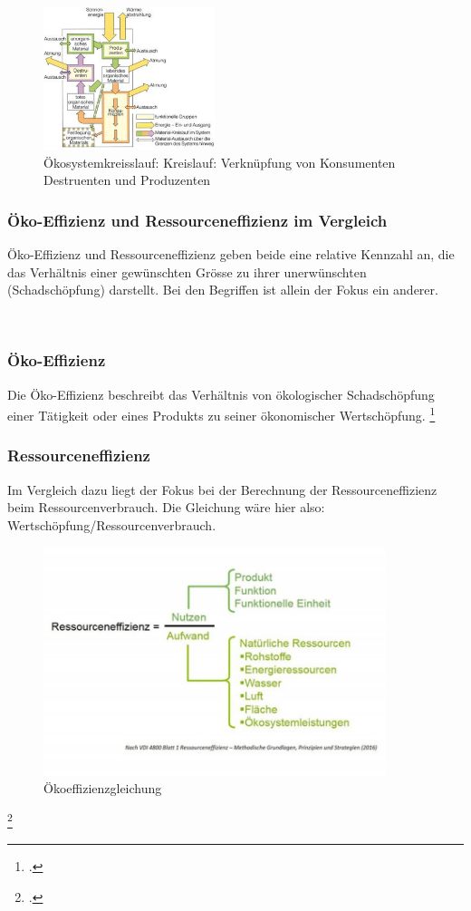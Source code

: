 \documentclass{scrartcl}
\begin{document}
\begin{figure}[htbp]
\centering
\includegraphics[width=5cm]{image_folder/oekosystemkreisslauf.png}
\caption{Ökosystemkreisslauf: Kreislauf: Verknüpfung von Konsumenten Destruenten und Produzenten}
\label{fig:Ökosystemkreisslauf}
\end{figure}



        
\subsubsection{Öko-Effizienz und Ressourceneffizienz im Vergleich}

Öko-Effizienz und Ressourceneffizienz geben beide eine relative Kennzahl an, die das Verhältnis einer gewünschten Grösse zu ihrer unerwünschten (Schadschöpfung) darstellt. Bei den Begriffen ist allein der Fokus ein anderer.

\\
\subsubsection{Öko-Effizienz}
Die Öko-Effizienz beschreibt das Verhältnis von ökologischer Schadschöpfung einer Tätigkeit oder eines Produkts zu seiner ökonomischer Wertschöpfung. \footcite[Vgl.][]{Schaltegger1990OkologischeUnternehmung} 

\subsubsection{Ressourceneffizienz}
Im Vergleich dazu liegt der Fokus bei der Berechnung der  Ressourceneffizienz beim Ressourcenverbrauch. Die Gleichung wäre hier also: Wertschöpfung/Ressourcenverbrauch.

\begin{figure}[htbp]
\centering
\includegraphics[width=10cm]{image_folder/ressourceneffizienz.jpg}
\caption{Ökoeffizienzgleichung}
\label{fig:Ökoeffizienzgleichung}
\end{figure}\footcite{Essel2010AnalyseFazit}
\end{document}
